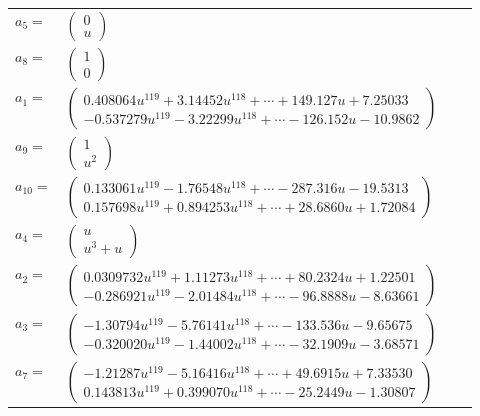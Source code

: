 \documentclass[1p]{elsarticle_modified}
\theoremstyle{definition}
\begin{document}
\begin{tabular}{m{7pt} m{180pt} m{7pt} m{180pt} }
\flushright $a_{5}=$&$\begin{pmatrix}0\\u\end{pmatrix}$ \\
\flushright $a_{8}=$&$\begin{pmatrix}1\\0\end{pmatrix}$ \\
\flushright $a_{1}=$&$\begin{pmatrix}0.408064 u^{119}+3.14452 u^{118}+\cdots+149.127 u+7.25033\\-0.537279 u^{119}-3.22299 u^{118}+\cdots-126.152 u-10.9862\end{pmatrix}$ \\
\flushright $a_{9}=$&$\begin{pmatrix}1\\u^2\end{pmatrix}$ \\
\flushright $a_{10}=$&$\begin{pmatrix}0.133061 u^{119}-1.76548 u^{118}+\cdots-287.316 u-19.5313\\0.157698 u^{119}+0.894253 u^{118}+\cdots+28.6860 u+1.72084\end{pmatrix}$ \\
\flushright $a_{4}=$&$\begin{pmatrix}u\\u^3+u\end{pmatrix}$ \\
\flushright $a_{2}=$&$\begin{pmatrix}0.0309732 u^{119}+1.11273 u^{118}+\cdots+80.2324 u+1.22501\\-0.286921 u^{119}-2.01484 u^{118}+\cdots-96.8888 u-8.63661\end{pmatrix}$ \\
\flushright $a_{3}=$&$\begin{pmatrix}-1.30794 u^{119}-5.76141 u^{118}+\cdots-133.536 u-9.65675\\-0.320020 u^{119}-1.44002 u^{118}+\cdots-32.1909 u-3.68571\end{pmatrix}$ \\
\flushright $a_{7}=$&$\begin{pmatrix}-1.21287 u^{119}-5.16416 u^{118}+\cdots+49.6915 u+7.33530\\0.143813 u^{119}+0.399070 u^{118}+\cdots-25.2449 u-1.30807\end{pmatrix}$ \\

\end{tabular}
\end{document}
